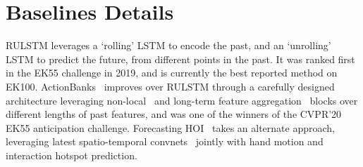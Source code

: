 \documentclass[10pt,twocolumn,letterpaper]{article}
\newcommand{\eknew}{EK100\xspace}
\newcommand{\ek}{EK55\xspace}
\newcommand{\rulstm}{RULSTM\xspace}
\newcommand{\acbank}{ActionBanks\xspace}
\begin{document}
\section{Baselines Details}\label{sec:appdx:baselines}
\rulstm leverages a `rolling' LSTM to encode the past, and an `unrolling' LSTM to predict the future, from different points in the past. It was ranked first in the \ek challenge in 2019, and is currently the best reported method on \eknew.
\acbank~\cite{sener2020temporal} improves over \rulstm through a carefully designed architecture leveraging non-local~\cite{wang2017non} and long-term feature aggregation~\cite{wu2019long} blocks over different lengths of past features, and was one of the winners of the CVPR'20 \ek anticipation challenge. Forecasting HOI~\cite{liu2020forecasting} takes an alternate approach, leveraging latest spatio-temporal convnets~\cite{tran2019video} jointly with hand motion and interaction hotspot prediction.
\end{document}
